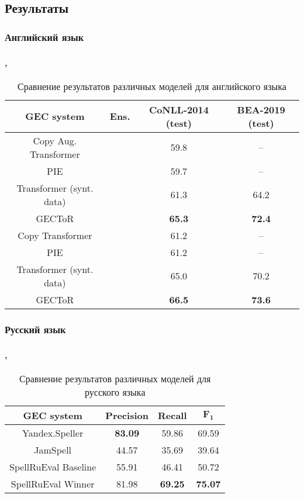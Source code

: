 \documentclass[t]{beamer}  %
\begin{document}
\subsection{Результаты}
\subsubsection{Английский язык}
\begin{frame}
	\frametitle{\insertsection} 
	\framesubtitle{\insertsubsection, \insertsubsubsection}
	\begin{table}
	\begin{center}
		\small
		\begin{tabular}{c c |c|c}
			\hline
			\textbf{GEC system} & \textbf{Ens.} & \textbf{CoNLL-2014 (test)}  & \textbf{BEA-2019 (test)}  \\
			\hline
			Copy Aug. Transformer &  & 59.8  & --  \\
			PIE &  & 59.7 & -- \\
			Transformer (synt. data) &  & 61.3 & 64.2  \\
			GECToR &  & \textbf{65.3} & \textbf{72.4}  \\
			\hline
			Copy Transformer & \checkmark & 61.2  & --  \\
			PIE & \checkmark & 61.2 & -- \\
			Transformer (synt. data) & \checkmark & 65.0 & 70.2  \\
			GECToR & \checkmark & \textbf{66.5} & \textbf{73.6}  \\
			\hline
		\end{tabular}
	\end{center}
	\caption{Сравнение результатов различных моделей для английского языка}
	\end{table}
\end{frame}

\subsubsection{Русский язык}
\begin{frame}
	\frametitle{\insertsection} 
	\framesubtitle{\insertsubsection, \insertsubsubsection}
		\begin{table}
		\begin{center}
			\small
			\begin{tabular}{c|c|c|c}
				\hline
				\textbf{GEC system} & \textbf{Precision}  & \textbf{Recall} & $\boldsymbol{F_1}$  \\
				\hline
				Yandex.Speller & \textbf{83.09}  & 59.86 & 69.59  \\
				JamSpell & 44.57 & 35.69 & 39.64 \\
				SpellRuEval Baseline & 55.91 & 46.41 & 50.72  \\
				SpellRuEval Winner & 81.98 & \textbf{69.25} & \textbf{75.07}  \\
				\hline
			\end{tabular}
		\end{center}
		\caption{Сравнение результатов различных моделей для русского языка}
	\end{table}
	
\end{frame}
\end{document}
